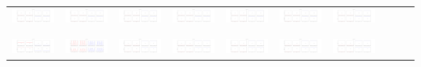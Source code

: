 \documentclass[]{article}
\begin{document}
\begin{table}[h]
\begin{tabular}{| c | c | c | c | c | c | c | c | c | c |}
		\includegraphics[width=0.09\linewidth]{0.10_0.30.png} &
		\includegraphics[width=0.09\linewidth]{0.10_0.40.png} &
		\includegraphics[width=0.09\linewidth]{0.10_0.50.png} &
		\includegraphics[width=0.09\linewidth]{0.10_0.60.png} &
		\includegraphics[width=0.09\linewidth]{0.10_0.70.png} &
		\includegraphics[width=0.09\linewidth]{0.10_0.80.png} &
		\includegraphics[width=0.09\linewidth]{0.10_0.90.png} \\
		& & & & & & & & & \\
		\hline
		& & & & & & & & & \\
		\includegraphics[width=0.09\linewidth]{0.20_0.00.png} &
		\includegraphics[width=0.09\linewidth]{0.20_0.10.png} &
		\includegraphics[width=0.09\linewidth]{0.20_0.20.png} &
		\includegraphics[width=0.09\linewidth]{0.20_0.30.png} &
		\includegraphics[width=0.09\linewidth]{0.20_0.40.png} &
		\includegraphics[width=0.09\linewidth]{0.20_0.50.png} &
		\includegraphics[width=0.09\linewidth]{0.20_0.60.png} &

\end{tabular}
\end{table}
\end{document}
